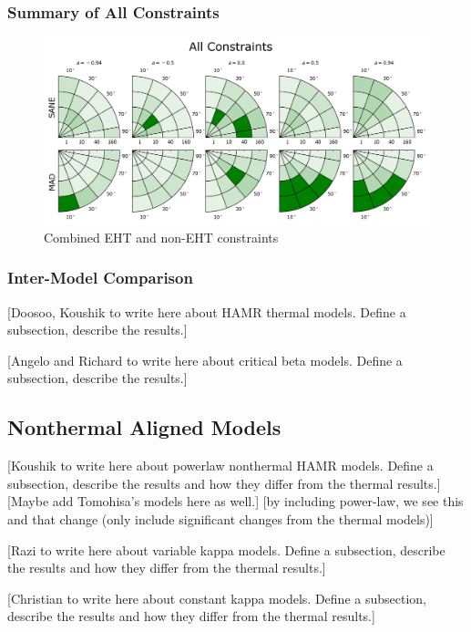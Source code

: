 \subsubsection{Summary of All Constraints}

\begin{figure}
  \centering
  \includegraphics[width=\columnwidth]{./figures/All_Hard_Cut.png}
  \caption{Combined EHT and non-EHT constraints}
  \label{fig:all_cuts}
\end{figure}

\subsubsection{Inter-Model Comparison}


[Doosoo, Koushik to write here about HAMR thermal models.  Define a subsection, describe the results.]

[Angelo and Richard to write here about critical beta models.  Define a subsection, describe the results.]




\subsection{Nonthermal Aligned Models}

[Koushik to write here about powerlaw nonthermal HAMR models.  Define a subsection, describe the results and how they differ from the thermal results.][Maybe add Tomohisa's models here as well.] [by including power-law, we see this and that change (only include significant changes from the thermal models)]

[Razi to write here about variable kappa models.  Define a subsection, describe the results and how they differ from the thermal results.]

[Christian to write here about constant kappa models.  Define a subsection, describe the results and how they differ from the thermal results.]
